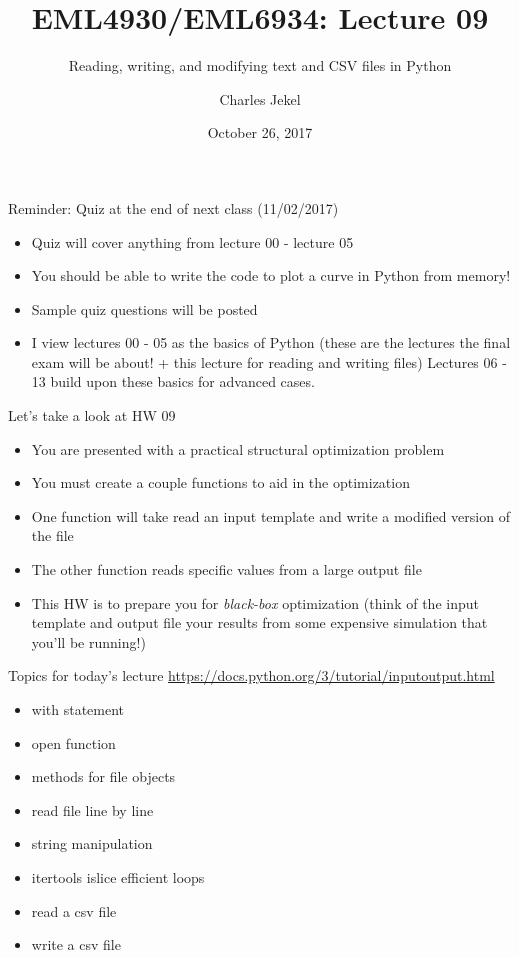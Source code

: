 \documentclass[10pt]{beamer}
\title{EML4930/EML6934: Lecture 09}
\subtitle{Reading, writing, and modifying text and CSV files in Python }
\date{October 26, 2017}
\author{Charles Jekel}
\begin{document}
\maketitle

\begin{frame}{Reminder: Quiz at the end of next class (11/02/2017)}
\begin{itemize}
\item Quiz will cover anything from lecture 00 - lecture 05
\item You should be able to write the code to plot a curve in Python from memory!
\item Sample quiz questions will be posted
\item I view lectures 00 - 05 as the basics of Python (these are the lectures the final exam will be about! + this lecture for reading and writing files) Lectures 06 - 13 build upon these basics for advanced cases. 
\end{itemize}
\end{frame}

\begin{frame}{Let's take a look at HW 09}
\begin{itemize}
\item You are presented with a practical structural optimization problem
\item You must create a couple functions to aid in the optimization
\item One function will take read an input template and write a modified version of the file
\item The other function reads specific values from a large output file
\item This HW is to prepare you for \textit{black-box} optimization (think of the input template and output file your results from some expensive simulation that you'll be running!)
\end{itemize}
\end{frame}

\begin{frame}{Topics for today's lecture}
\url{https://docs.python.org/3/tutorial/inputoutput.html}
\begin{itemize}
\item with statement
\item open function
\item methods for file objects
\item read file line by line
\item string manipulation
\item itertools islice efficient loops
\item read a csv file
\item write a csv file
\end{itemize}
\end{frame}
\end{document}
